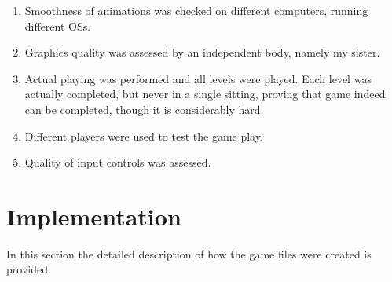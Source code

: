 \documentclass[11pt,a4paper,notitlepage]{report}
\begin{document}
				\begin{enumerate}
					\item
						Smoothness of animations was checked on different computers, running different OSs.
					\item
						Graphics quality was assessed by an independent body, namely my sister.
					\item
						Actual playing was performed and all levels were played. Each level was actually completed, but never in a single sitting, proving that game indeed can be completed, though it is considerably hard.
					\item
						Different players were used to test the game play.
					\item
						Quality of input controls was assessed.
				\end{enumerate}
	\chapter{Implementation}
		In this section the detailed description of how the game files were created is provided.
\end{document}
